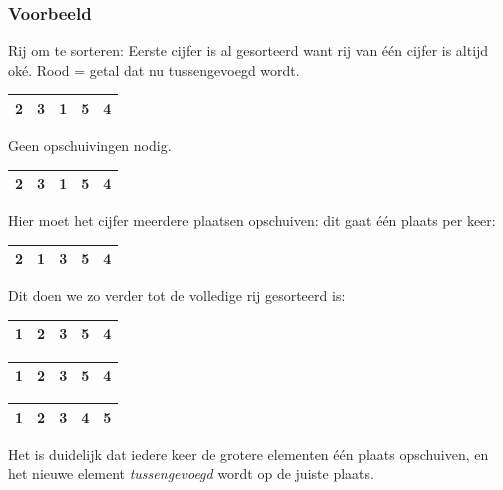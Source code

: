 \documentclass{article}
\begin{document}
\subsubsection{Voorbeeld} %
\label{sub:ins_sort_voorbeeld}
Rij om te sorteren: Eerste cijfer is al gesorteerd want rij van één cijfer is altijd oké.
Rood = getal dat nu tussengevoegd wordt.
\begin{center}
\begin{tabular}{ |c|c|c|c|c| }
\hline
\cellcolor{gray}2 & \cellcolor{red}3 & 1 & 5 & 4 \\
\hline
\end{tabular}
\end{center}
Geen opschuivingen nodig.
\begin{center}
\begin{tabular}{ |c|c|c|c|c| }
\hline
\cellcolor{gray}2 & \cellcolor{gray}3 & \cellcolor{red}1 & 5 & 4 \\
\hline
\end{tabular}
\end{center}
Hier moet het cijfer meerdere plaatsen opschuiven: dit gaat één plaats per keer:
\begin{center}
\begin{tabular}{ |c|c|c|c|c| }
\hline
\cellcolor{gray}2 & \cellcolor{red}1 & \cellcolor{gray}3 & 5 & 4 \\
\hline
\end{tabular}
\end{center}
Dit doen we zo verder tot de volledige rij gesorteerd is:
\begin{center}
\begin{tabular}{ |c|c|c|c|c| }
\hline
\cellcolor{gray}1 & \cellcolor{gray}2 & \cellcolor{gray}3 & \cellcolor{red}5 & 4 \\
\hline
\end{tabular}
\end{center}
\begin{center}
\begin{tabular}{ |c|c|c|c|c| }
\hline
\cellcolor{gray}1 & \cellcolor{gray}2 & \cellcolor{gray}3 & \cellcolor{gray}5 & \cellcolor{red}4 \\
\hline
\end{tabular}
\end{center}
\begin{center}
\begin{tabular}{ |c|c|c|c|c| }
\hline
\cellcolor{gray}1 & \cellcolor{gray}2 & \cellcolor{gray}3 & \cellcolor{gray}4 & \cellcolor{gray}5 \\
\hline
\end{tabular}
\end{center}
Het is duidelijk dat iedere keer de grotere elementen één plaats opschuiven, en het nieuwe element \textit{tussengevoegd} wordt op de juiste plaats.
\end{document}

